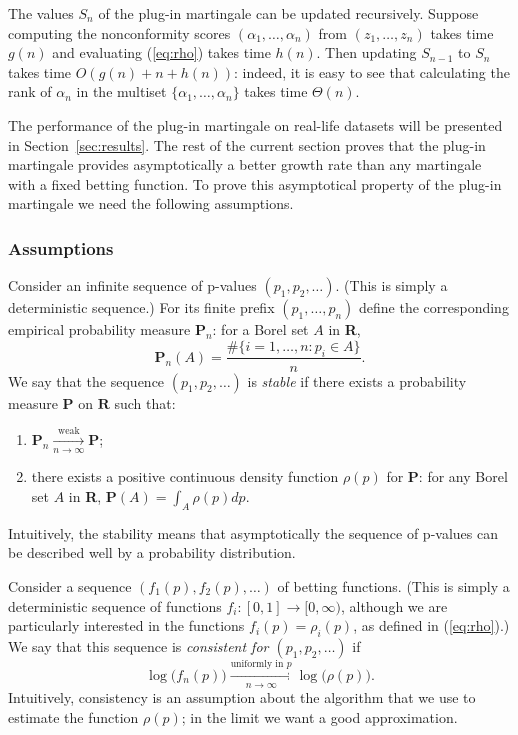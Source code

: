 \documentclass{article}
\theoremstyle{definition}
\begin{document}
The values $S_n$ of the plug-in martingale can be updated recursively.
Suppose computing the nonconformity scores $(\alpha_1,\ldots,\alpha_n)$
from $(z_1,\ldots,z_n)$ takes time $g(n)$
and evaluating (\ref{eq:rho}) takes time $h(n)$.
Then updating $S_{n-1}$ to $S_n$ takes time
$O(g(n)+n+h(n))$:
indeed, it is easy to see that calculating the rank of $\alpha_n$ in the multiset $\{\alpha_1,\ldots,\alpha_n\}$
takes time $\Theta(n)$.

The performance of the plug-in martingale on real-life datasets will be presented
in Section~\ref{sec:results}.
The rest of the current section proves that the plug-in martingale
provides asymptotically a better growth rate than any martingale with a fixed betting
function. To prove this asymptotical property of the plug-in martingale we need
the following assumptions.

\subsubsection{Assumptions}

Consider an infinite sequence of p-values $(p_1, p_2, \ldots)$.
(This is simply a deterministic sequence.)
For its finite prefix $(p_1,\ldots, p_n)$ define the corresponding empirical
probability measure $\textbf{P}_n$:
for a Borel set $A$ in \textbf{R},
$$\textbf{P}_n(A) = \frac{\#\{i=1,\ldots,n: p_i \in A\}}{n}.$$
We say that the sequence $(p_1, p_2, \ldots)$ is \emph{stable}
if there exists a probability measure \textbf{P} on $\textbf{R}$ such that:
\begin{enumerate}
  \item $\textbf{P}_n\xrightarrow[n\rightarrow\infty]{\mbox{weak}} \textbf{P}$;
  \item there exists a positive continuous density function $\rho(p)$ for $\textbf{P}$:
   for any Borel set $A$ in \textbf{R},
   $\textbf{P}(A) = \int_A \rho(p)d p$.
\end{enumerate}
Intuitively, the stability means that asymptotically the sequence of p-values
can be described well by a probability distribution.

Consider a sequence $(f_1(p), f_2(p),\ldots)$ of betting functions.
(This is simply a deterministic sequence of functions $f_i:[0,1]\to[0,\infty)$,
although we are particularly interested in the functions $f_i(p)=\rho_i(p)$, as defined in (\ref{eq:rho}).)
We say that this sequence is \emph{consistent for $(p_1,p_2,\ldots)$} if
$$\log\bigl(f_n(p)\bigr) \xrightarrow[n\rightarrow\infty]{\mbox{uniformly in $p$}} \log\bigl(\rho(p)).$$
Intuitively, consistency is an assumption about the algorithm that we use to estimate the function $\rho(p)$;
in the limit we want a good approximation.
\end{document}
